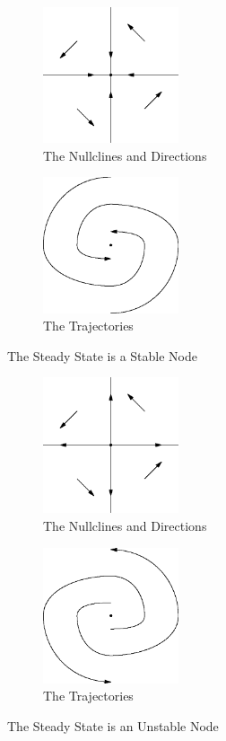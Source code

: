 \documentclass[fleqn,letterpaper]{report}
\begin{document}
\begin{figure}[t]
\centering
\begin{subfigure}{.5\textwidth}
\centering
\includegraphics[width=4cm]{figure32.eps}
\caption{The Nullclines and Directions}
\end{subfigure}%
\begin{subfigure}{.5\textwidth}
\centering
\includegraphics[width=4cm]{figure47.eps}
\caption{The Trajectories}
\end{subfigure}
\caption{The Steady State is a Stable Node}
\label{figure-stable-node}
\end{figure}

\begin{figure}[h!]
\centering
\begin{subfigure}{.5\textwidth}
\centering
\includegraphics[width=4cm]{figure33.eps}
\caption{The Nullclines and Directions}
\end{subfigure}%
\begin{subfigure}{.5\textwidth}
\centering
\includegraphics[width=4cm]{figure48.eps}
\caption{The Trajectories}
\end{subfigure}
\caption{The Steady State is an Unstable Node}
\label{figure-unstable-node}
\end{figure}
\end{document}
